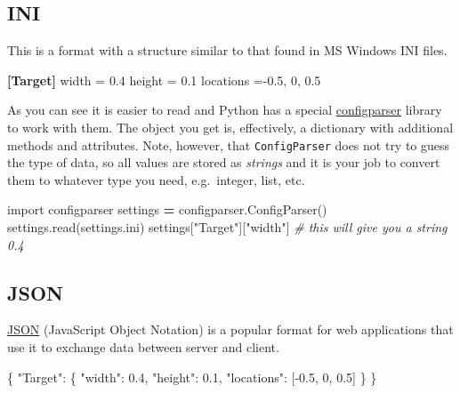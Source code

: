 \documentclass[
]{book}
\newenvironment{Shaded}{\begin{snugshade}}{\end{snugshade}}
\newcommand{\CommentTok}[1]{\textcolor[rgb]{0.56,0.35,0.01}{\textit{#1}}}
\newcommand{\DataTypeTok}[1]{\textcolor[rgb]{0.13,0.29,0.53}{#1}}
\newcommand{\DecValTok}[1]{\textcolor[rgb]{0.00,0.00,0.81}{#1}}
\newcommand{\FloatTok}[1]{\textcolor[rgb]{0.00,0.00,0.81}{#1}}
\newcommand{\FunctionTok}[1]{\textcolor[rgb]{0.00,0.00,0.00}{#1}}
\newcommand{\ImportTok}[1]{#1}
\newcommand{\KeywordTok}[1]{\textcolor[rgb]{0.13,0.29,0.53}{\textbf{#1}}}
\newcommand{\NormalTok}[1]{#1}
\newcommand{\OperatorTok}[1]{\textcolor[rgb]{0.81,0.36,0.00}{\textbf{#1}}}
\newcommand{\OtherTok}[1]{\textcolor[rgb]{0.56,0.35,0.01}{#1}}
\newcommand{\StringTok}[1]{\textcolor[rgb]{0.31,0.60,0.02}{#1}}
\begin{document}
\hypertarget{ini}{%
\subsection{INI}\label{ini}}

This is a format with a structure similar to that found in MS Windows INI files.

\begin{Shaded}
\begin{Highlighting}[]
\KeywordTok{[Target]}
\DataTypeTok{width }\OtherTok{=}\StringTok{ }\FloatTok{0.4}
\DataTypeTok{height }\OtherTok{=}\StringTok{ }\FloatTok{0.1}
\DataTypeTok{locations }\OtherTok{=}\StringTok{ {-}}\FloatTok{0.5}\StringTok{, }\DecValTok{0}\StringTok{, }\FloatTok{0.5}
\end{Highlighting}
\end{Shaded}

As you can see it is easier to read and Python has a special \href{https://docs.python.org/3/library/configparser.html}{configparser} library to work with them. The object you get is, effectively, a dictionary with additional methods and attributes. Note, however, that \texttt{ConfigParser} does not try to guess the type of data, so all values are stored as \emph{strings} and it is your job to convert them to whatever type you need, e.g.~integer, list, etc.

\begin{Shaded}
\begin{Highlighting}[]
\ImportTok{import}\NormalTok{ configparser}
\NormalTok{settings }\OperatorTok{=}\NormalTok{ configparser.ConfigParser()}
\NormalTok{settings.read(}\StringTok{\textquotesingle{}settings.ini\textquotesingle{}}\NormalTok{)}
\NormalTok{settings[}\StringTok{"Target"}\NormalTok{][}\StringTok{"width"}\NormalTok{] }\CommentTok{\# this will give you a string \textquotesingle{}0.4\textquotesingle{}}
\end{Highlighting}
\end{Shaded}

\hypertarget{json}{%
\subsection{JSON}\label{json}}

\href{https://en.wikipedia.org/wiki/JSON}{JSON} (JavaScript Object Notation) is a popular format for web applications that use it to exchange data between server and client.

\begin{Shaded}
\begin{Highlighting}[]
\FunctionTok{\{}
  \DataTypeTok{"Target"}\FunctionTok{:} \FunctionTok{\{}
    \DataTypeTok{"width"}\FunctionTok{:} \FloatTok{0.4}\FunctionTok{,}
    \DataTypeTok{"height"}\FunctionTok{:} \FloatTok{0.1}\FunctionTok{,}
    \DataTypeTok{"locations"}\FunctionTok{:} \OtherTok{[}\FloatTok{{-}0.5}\OtherTok{,} \DecValTok{0}\OtherTok{,} \FloatTok{0.5}\OtherTok{]}
  \FunctionTok{\}}
\FunctionTok{\}}
\end{Highlighting}
\end{Shaded}
\end{document}
